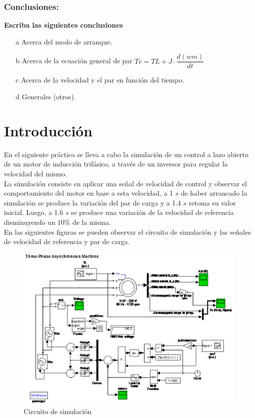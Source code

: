 \documentclass[11pt, a4paper]{article}
\begin{document}
\subsubsection*{ Conclusiones:}

\textbf{Escriba las siguientes conclusiones}

\begin{itemize}
\item[a] Acerca del modo de arranque.
\item[b] Acerca de la ecuación general de par $Te=TL+J\cdot \dfrac{d(wm)}{dt} $
\item[c] Acerca de la velocidad y el par en función del tiempo.
\item[d] Generales (otros).

\end{itemize}






\newpage

\section{Introducción}
En el siguiente práctico se lleva a cabo la simulación de un control a lazo abierto de un motor de inducción trifásico, a través de un inversor para  regular la velocidad del mismo.\\
La simulación consiste en aplicar una señal de velocidad de control y observar el comportamiento del motor en base a esta velocidad, a 1 $s$ de haber arrancado la simulación se produce la variación del par de carga y a 1.4 $s$ retoma su valor inicial. Luego,  a 1.6 $s$ se produce una variación de la velocidad de referencia disminuyendo un $10\%$ de la misma.\\
En las siguientes figuras se pueden observar el circuito de simulación y las señales de velocidad de referencia y par de carga.\\

\begin{figure}[H]
\centering
\includegraphics[scale=0.8]{imagenes/circuito}
\caption{Circuito de simulación}
\label{circuito}
\end{figure}
\end{document}
